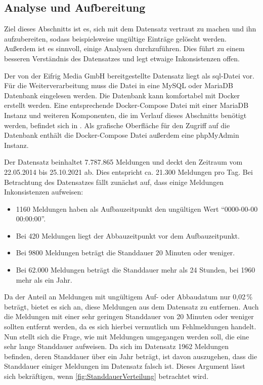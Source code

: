 \subsection{Analyse und Aufbereitung}
\label{sec:AnalyseAufbereitung}

Ziel dieses Abschnitts ist es, sich mit dem Datensatz vertraut zu machen und ihn aufzubereiten, sodass beispielsweise ungültige Einträge gelöscht werden.
Außerdem ist es sinnvoll, einige Analysen durchzuführen.
Dies führt zu einem besseren Verständnis des Datensatzes und legt etwaige Inkonsistenzen offen.

Der von der Eifrig Media GmbH bereitgestellte Datensatz liegt als sql-Datei vor.
Für die Weiterverarbeitung muss die Datei in eine MySQL oder MariaDB Datenbank eingelesen werden.
Die Datenbank kann komfortabel mit Docker erstellt werden.
Eine entsprechende Docker-Compose Datei mit einer MariaDB Instanz und weiteren Komponenten, die im Verlauf dieses Abschnitts benötigt werden, befindet sich in .
Als grafische Oberfläche für den Zugriff auf die Datenbank enthält die Docker-Compose Datei außerdem eine phpMyAdmin Instanz.

Der Datensatz beinhaltet 7.787.865 Meldungen und deckt den Zeitraum vom 22.05.2014 bis 25.10.2021 ab. Dies entspricht ca. 21.300 Meldungen pro Tag.
Bei Betrachtung des Datensatzes fällt zunächst auf, dass einige Meldungen Inkonsistenzen aufweisen:

\begin{itemize}
    \setlength\itemsep{-15pt}
    \item 1160 Meldungen haben als Aufbauzeitpunkt den ungültigen Wert "`0000-00-00 00:00:00"'.
    \item Bei 420 Meldungen liegt der Abbauzeitpunkt vor dem Aufbauzeitpunkt.
    \item Bei 9800 Meldungen beträgt die Standdauer 20 Minuten oder weniger.
    \item Bei 62.000 Meldungen beträgt die Standdauer mehr als 24 Stunden, bei 1960 mehr als ein Jahr.
\end{itemize}

Da der Anteil an Meldungen mit ungültigem Auf- oder Abbaudatum nur 0,02\,\% beträgt, bietet es sich an, diese Meldungen aus dem Datensatz zu entfernen.
Auch die Meldungen mit einer sehr geringen Standdauer von 20 Minuten oder weniger sollten entfernt werden, da es sich hierbei vermutlich um Fehlmeldungen handelt.
Nun stellt sich die Frage, wie mit Meldungen umgegangen werden soll, die eine sehr lange Standdauer aufweisen.
Da sich im Datensatz 1962 Meldungen befinden, deren Standdauer über ein Jahr beträgt, ist davon auszugehen, dass die Standdauer einiger Meldungen im Datensatz falsch ist.
Dieses Argument lässt sich bekräftigen, wenn \autoref{fig:StanddauerVerteilung} betrachtet wird.

